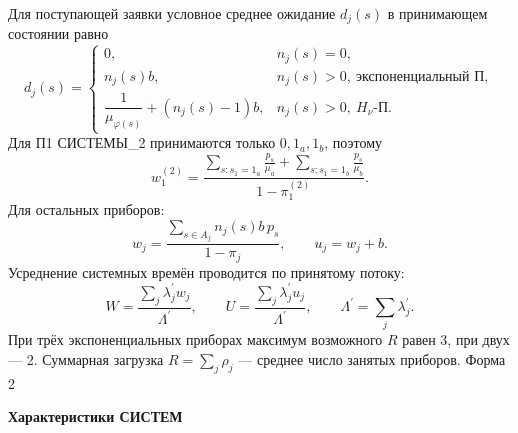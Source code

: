 \documentclass[12pt,a4paper]{article}
\newcommand{\formtitle}[2]{\noindent\hfill Форма #1\par\begin{center}\textbf{#2}\end{center}}
\begin{document}
Для поступающей заявки условное среднее ожидание $d_j(s)$ в принимающем состоянии равно
\begin{equation}
d_j(s)=\begin{cases}
0,&n_j(s)=0,\\
n_j(s)b,&n_j(s)>0,\ \text{экспоненциальный П},\\
\dfrac1{\mu_{\varphi(s)}}+(n_j(s)-1)b,&n_j(s)>0,\ H_{\nu}\text{-П}.
\end{cases}\label{eq:waitstate}
\end{equation}
Для П1 СИСТЕМЫ\_2 принимаются только $0,1_a,1_b$, поэтому
\begin{equation}
w_1^{(2)}=\frac{\displaystyle\sum_{s:s_1=1_a}\frac{p_s}{\mu_a}+
\displaystyle\sum_{s:s_1=1_b}\frac{p_s}{\mu_b}}{1-\pi_1^{(2)}}.
\end{equation}
Для остальных приборов:
\begin{equation}
w_j=\frac{\displaystyle\sum_{s\in A_j}n_j(s)b\,p_s}{1-\pi_j},\qquad u_j=w_j+b.
\end{equation}
Усреднение системных времён проводится по принятому потоку:
\begin{equation}
W=\frac{\sum_j\lambda_j^{\prime}w_j}{\Lambda^{\prime}},\qquad
U=\frac{\sum_j\lambda_j^{\prime}u_j}{\Lambda^{\prime}},\qquad
\Lambda^{\prime}=\sum_j\lambda_j^{\prime}.
\end{equation}
При трёх экспоненциальных приборах максимум возможного $R$ равен 3, при двух --- 2. Суммарная загрузка $R=\sum_j\rho_j$ --- среднее число занятых приборов.
\newpage
\formtitle{2}{Характеристики СИСТЕМ}
\end{document}
